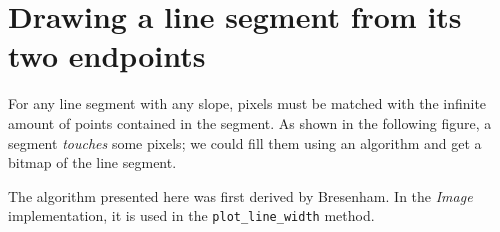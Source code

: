\documentclass[12pt,a4,oneside,usenames,dvipsnames]{book}
\newcommand\bitmap{{\pixel{}bitmap}}
\begin{document}
\section{Drawing a line segment from its two endpoints}

For any line segment with any slope, pixels must be matched with the infinite
amount of points contained in the segment. As shown in the following figure, a segment \emph{touches} some pixels; we could fill them using an algorithm and get a \bitmap{} of the line segment.

\begin{center}

\end{center}

The algorithm presented here was first derived by Bresenham. In the \emph{Image} implementation, it is used in the \texttt{plot\_line\_width} method.
\end{document}
